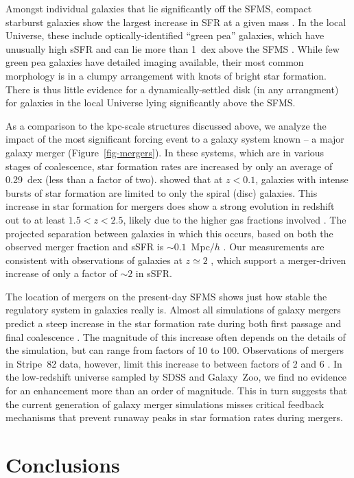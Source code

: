 \documentclass[useAMS,usenatbib]{mn2e}
\begin{document}
Amongst individual galaxies that lie significantly off the SFMS, compact starburst galaxies show the largest increase in SFR at a given mass \citep{elb11}. In the local Universe, these include optically-identified ``green pea'' galaxies, which have unusually high sSFR and can lie more than 1~dex above the SFMS \citep{car09}. While few green pea galaxies have detailed imaging available, their most common morphology is in a clumpy arrangement with knots of bright star formation. There is thus little evidence for a dynamically-settled disk (in any arrangment) for galaxies in the local Universe lying significantly above the SFMS. 

As a comparison to the kpc-scale structures discussed above, we analyze the impact of the most significant forcing event to a galaxy system known -- a major galaxy merger (Figure~\ref{fig-mergers}). In these systems, which are in various stages of coalescence, star formation rates are increased by only an average of 0.29~dex (less than a factor of two). \citet{dar10} showed that at $z<0.1$, galaxies with intense bursts of star formation are limited to only the spiral (disc) galaxies. This increase in star formation for mergers does show a strong evolution in redshift out to at least $1.5<z<2.5$, likely due to the higher gas fractions involved \citep{dad10,rod11}. The projected separation between galaxies in which this occurs, based on both the observed merger fraction and sSFR is $\sim0.1$~Mpc$/h$ \citep{ski09}. Our measurements are consistent with observations of galaxies at $z\simeq2$ \citep{kav13b}, which support a merger-driven increase of only a factor of $\sim2$ in sSFR. 

The location of mergers on the present-day SFMS shows just how stable the regulatory system in galaxies really is. Almost all simulations of galaxy mergers predict a steep increase in the star formation rate during both first passage and final coalescence \citep[e.g.,][]{hop08}. The magnitude of this increase often depends on the details of the simulation, but can range from factors of 10 to 100. Observations of mergers in Stripe~82 data, however, limit this increase to between factors of 2 and 6 \citep{kav14}. In the low-redshift universe sampled by SDSS and Galaxy~Zoo, we find no evidence for an enhancement more than an order of magnitude. This in turn suggests that the current generation of galaxy merger simulations misses critical feedback mechanisms that prevent runaway peaks in star formation rates during mergers.

\section{Conclusions}
\end{document}
